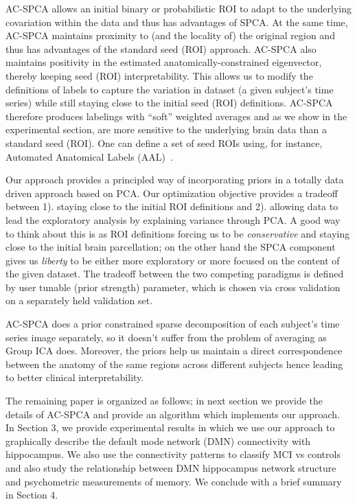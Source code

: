 \documentclass{llncs}
\begin{document}
AC-SPCA allows an initial binary or probabilistic ROI to adapt to
the underlying covariation within the data and thus has advantages of
SPCA.  At the same time, AC-SPCA maintains proximity to (and the
locality of) the original region and thus has advantages of the
standard seed (ROI) approach.  AC-SPCA also maintains positivity in the
estimated anatomically-constrained eigenvector, thereby keeping seed (ROI)
interpretability. This allows us to modify the definitions of labels to capture the variation in dataset (a given subject's time series) while still staying close to the initial seed (ROI) definitions. AC-SPCA therefore produces
labelings with ``soft'' weighted averages and as we show in the
experimental section, are more sensitive to the underlying
brain data than a standard seed (ROI). One can define a set of seed ROIs using, for instance, Automated Anatomical Labels (AAL)~\cite{tzourio2002automated}.

Our approach provides a principled way of incorporating priors in a totally data driven approach based on PCA. Our optimization objective provides a tradeoff between 1). staying close to the initial ROI definitions and 2). allowing data to lead the exploratory analysis by explaining variance through PCA. A good way to think about this is as ROI definitions forcing us to be {\em conservative} and staying close to the initial brain parcellation; on the other hand the SPCA component gives us {\em liberty} to be either more exploratory or more focused on the content of the given dataset. The tradeoff between the two competing paradigms is defined by user tunable (prior strength) parameter, which is chosen via cross validation on a separately held validation set. 

AC-SPCA does a prior constrained sparse decomposition of each subject's time series image separately, so it doesn't suffer from the problem of averaging as Group ICA does. Moreover, the priors help us maintain a direct correspondence between the anatomy of the same regions across different subjects hence leading to better clinical interpretability.

The remaining paper is organized as follows; in next section we provide the details of AC-SPCA and provide an algorithm which implements our approach. In Section 3, we provide experimental results in which we use our approach to graphically describe the default mode network (DMN) connectivity with hippocampus. We also use the connectivity patterns to classify MCI vs controls and also study the relationship between DMN hippocampus network structure and psychometric measurements of memory. We conclude with a brief summary in Section 4.
\end{document}
